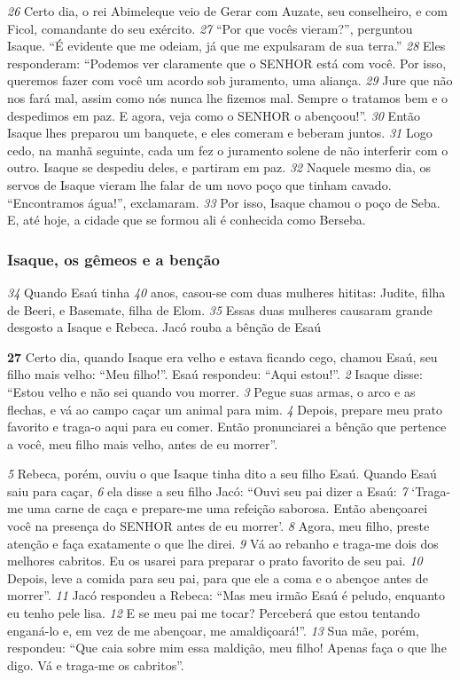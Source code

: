 \bigskip   
\textit{\tiny 26}
Certo dia, o rei Abimeleque veio de Gerar com Auzate, seu conselheiro, e com
Ficol, comandante do seu exército. 
\textit{\tiny 27}
“Por que vocês vieram?”, perguntou Isaque.
“É evidente que me odeiam, já que me expulsaram de sua terra.”
\textit{\tiny 28}
Eles responderam: “Podemos ver claramente que o SENHOR está com você. Por
isso, queremos fazer com você um acordo sob juramento, uma aliança. 
\textit{\tiny 29}
Jure que
não nos fará mal, assim como nós nunca lhe fizemos mal. Sempre o tratamos bem
e o despedimos em paz. E agora, veja como o SENHOR o abençoou!”.
\textit{\tiny 30}
Então Isaque lhes preparou um banquete, e eles comeram e beberam juntos.
\textit{\tiny 31}
Logo cedo, na manhã seguinte, cada um fez o juramento solene de não
interferir com o outro. Isaque se despediu deles, e partiram em paz.
\textit{\tiny 32}
Naquele mesmo dia, os servos de Isaque vieram lhe falar de um novo poço
que tinham cavado. “Encontramos água!”, exclamaram. 
\textit{\tiny 33}
Por isso, Isaque chamou
o poço de Seba. E, até hoje, a cidade que se formou ali é conhecida como
Berseba.


\subsubsection*{Isaque, os gêmeos e a benção}
\textit{\tiny 34}
Quando Esaú tinha 
\textit{\tiny 40}
 anos, casou-se com duas mulheres hititas: Judite, filha
de Beeri, e Basemate, filha de Elom. 
\textit{\tiny 35}
Essas duas mulheres causaram grande
desgosto a Isaque e Rebeca.
Jacó rouba a bênção de Esaú
   
\bigskip  
\textbf{\large 27}
 Certo dia, quando Isaque era velho e estava ficando cego, chamou Esaú,
seu filho mais velho: “Meu filho!”.
   Esaú respondeu: “Aqui estou!”.
\textit{\tiny 2}
Isaque disse: “Estou velho e não sei quando vou morrer. 
\textit{\tiny 3}
Pegue suas armas, o
arco e as flechas, e vá ao campo caçar um animal para mim. 
\textit{\tiny 4}
Depois, prepare meu
prato favorito e traga-o aqui para eu comer. Então pronunciarei a bênção que
pertence a você, meu filho mais velho, antes de eu morrer”.

\bigskip  
\textit{\tiny 5}
Rebeca, porém, ouviu o que Isaque tinha dito a seu filho Esaú. Quando Esaú
saiu para caçar, 
\textit{\tiny 6}
ela disse a seu filho Jacó: “Ouvi seu pai dizer a Esaú: 
\textit{\tiny 7}
‘Traga-me
uma carne de caça e prepare-me uma refeição saborosa. Então abençoarei você
na presença do SENHOR antes de eu morrer’. 
\textit{\tiny 8}
Agora, meu filho, preste atenção e
faça exatamente o que lhe direi. 
\textit{\tiny 9}
Vá ao rebanho e traga-me dois dos melhores
cabritos. Eu os usarei para preparar o prato favorito de seu pai. 
\textit{\tiny 10}
Depois, leve a
comida para seu pai, para que ele a coma e o abençoe antes de morrer”.
\textit{\tiny 11}
Jacó respondeu a Rebeca: “Mas meu irmão Esaú é peludo, enquanto eu tenho
pele lisa. 
\textit{\tiny 12}
E se meu pai me tocar? Perceberá que estou tentando enganá-lo e, em
vez de me abençoar, me amaldiçoará!”.
\textit{\tiny 13}
Sua mãe, porém, respondeu: “Que caia sobre mim essa maldição, meu filho!
Apenas faça o que lhe digo. Vá e traga-me os cabritos”.

